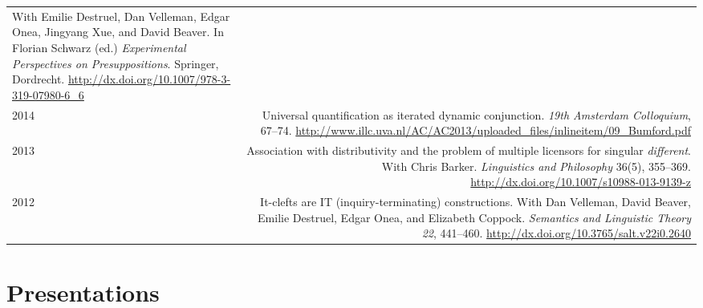 \documentclass[12pt]{article}
\newcommand{\doi}[1]{\url{http://dx.doi.org/#1}}
\newcommand{\refmark}{\textcolor{gray}{\textdagger}}
\begin{document}
\begin{longtable}{LR}
          With Emilie Destruel, Dan Velleman, Edgar Onea, Jingyang Xue, and
          David Beaver.\newline
          In Florian Schwarz (ed.) \textit{Experimental Perspectives on
          Presuppositions}. Springer, Dordrecht.\newline
          \doi{10.1007/978-3-319-07980-6_6}\\ %
  2014  & Universal quantification as iterated dynamic conjunction.\newline
          \textit{19th Amsterdam Colloquium}, 67--74.\newline
          \url{http://www.illc.uva.nl/AC/AC2013/uploaded_files/inlineitem/09_Bumford.pdf}\\
  2013  & Association with distributivity and the problem of multiple
          licensors for singular \textit{different}.\newline
          With Chris Barker.\newline
          \textit{Linguistics and Philosophy} 36(5), 355--369.\newline
          \doi{10.1007/s10988-013-9139-z}\\ %
  2012  & It-clefts are IT (inquiry-terminating) constructions.\newline
          With Dan Velleman, David Beaver, Emilie Destruel, Edgar Onea, and
          Elizabeth Coppock.\newline
          \textit{Semantics and Linguistic Theory 22}, 441--460.\newline
          \doi{10.3765/salt.v22i0.2640}
\end{longtable}
\endgroup

\medskip

\section*{Presentations}
\end{document}
